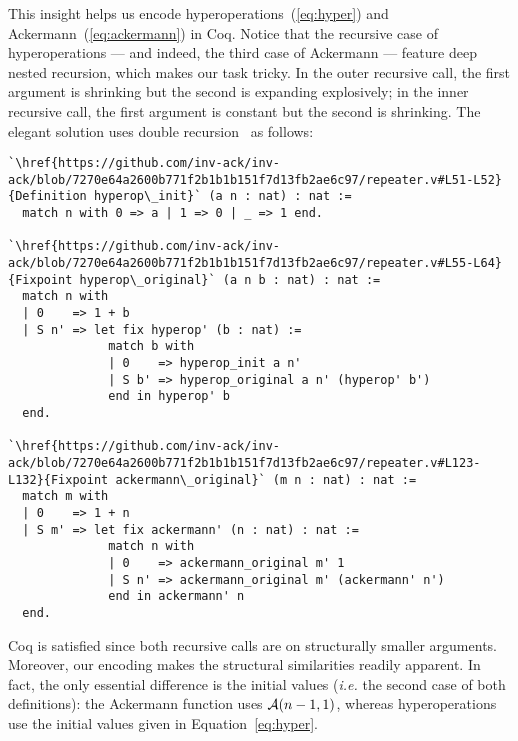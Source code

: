 This insight helps us encode hyperoperations~(\ref{eq:hyper}) and
Ackermann~(\ref{eq:ackermann}) in Coq.  Notice that the recursive case of hyperoperations --- and
indeed, the third case of Ackermann --- feature deep nested recursion, 
which makes our task tricky. 
In the outer recursive call, the first argument is shrinking
but the second is expanding explosively; in the inner recursive call, the first argument is
constant but the second is shrinking. The elegant solution uses double recursion~\cite{bertotcast} as follows:
\begin{lstlisting}
`\href{https://github.com/inv-ack/inv-ack/blob/7270e64a2600b771f2b1b1b151f7d13fb2ae6c97/repeater.v#L51-L52}{Definition hyperop\_init}` (a n : nat) : nat :=
  match n with 0 => a | 1 => 0 | _ => 1 end.

`\href{https://github.com/inv-ack/inv-ack/blob/7270e64a2600b771f2b1b1b151f7d13fb2ae6c97/repeater.v#L55-L64}{Fixpoint hyperop\_original}` (a n b : nat) : nat :=
  match n with
  | 0    => 1 + b
  | S n' => let fix hyperop' (b : nat) :=
              match b with
              | 0    => hyperop_init a n'
              | S b' => hyperop_original a n' (hyperop' b')
              end in hyperop' b
  end.

`\href{https://github.com/inv-ack/inv-ack/blob/7270e64a2600b771f2b1b1b151f7d13fb2ae6c97/repeater.v#L123-L132}{Fixpoint ackermann\_original}` (m n : nat) : nat :=
  match m with
  | 0    => 1 + n
  | S m' => let fix ackermann' (n : nat) : nat :=
              match n with
              | 0    => ackermann_original m' 1
              | S n' => ackermann_original m' (ackermann' n')
              end in ackermann' n
  end.
\end{lstlisting}
Coq is satisfied since both recursive calls are on structurally smaller arguments.
Moreover, our encoding makes the structural similarities
 readily apparent.  In fact, the only essential difference is the initial values
(\emph{i.e.} the second case of both definitions): the Ackermann function uses $\mathcal{A}(n-1,1)$, whereas
hyperoperations use the initial values given in Equation~\ref{eq:hyper}.

